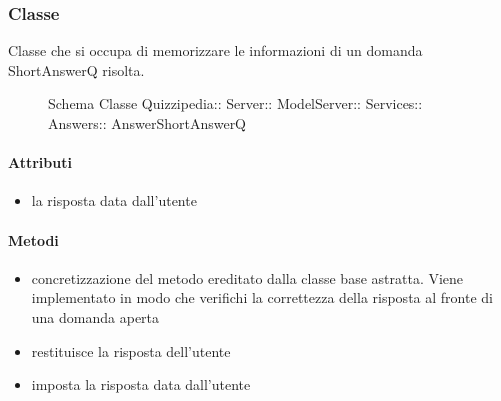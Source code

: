 \subsubsection{Classe }
Classe che si occupa di memorizzare le informazioni di un domanda ShortAnswerQ risolta.
\begin{figure}[H]
\centering
\noindent{}
\caption[Schema Classe AnswerShortAnswerQ]{Schema Classe Quizzipedia:: Server:: ModelServer:: Services:: Answers:: AnswerShortAnswerQ}
\end{figure}
\paragraph{Attributi}
\begin{itemize}
\item {}
\newline
la risposta data dall'utente
\end{itemize}
\paragraph{Metodi}
\begin{itemize}
\item {}
\newline
concretizzazione del metodo ereditato dalla classe base astratta. Viene implementato in modo che verifichi la correttezza della risposta al fronte di una domanda aperta
\newline
\item {}
\newline
restituisce la risposta dell'utente
\newline
\item {}
\newline
imposta la risposta data dall'utente
\newline
\end{itemize}
